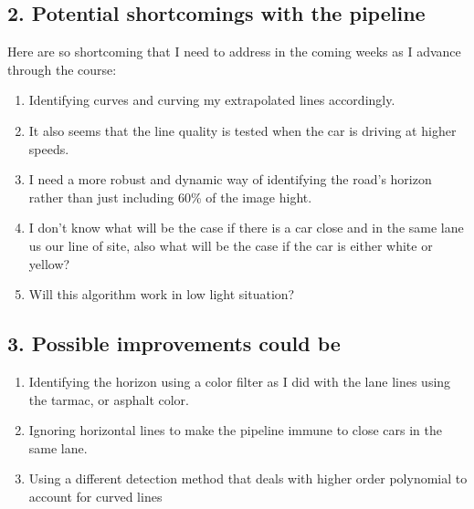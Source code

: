 \documentclass[11pt]{article}
\providecommand{\tightlist}{%
      \setlength{\itemsep}{0pt}\setlength{\parskip}{0pt}}
\begin{document}
    \hypertarget{potential-shortcomings-with-the-pipeline}{%
\subsection{2. Potential shortcomings with the
pipeline}\label{potential-shortcomings-with-the-pipeline}}

Here are so shortcoming that I need to address in the coming weeks as I
advance through the course:

\begin{enumerate}
\def\labelenumi{\arabic{enumi}.}
\tightlist
\item
  Identifying curves and curving my extrapolated lines accordingly.
\item
  It also seems that the line quality is tested when the car is driving
  at higher speeds.
\item
  I need a more robust and dynamic way of identifying the road's horizon
  rather than just including 60\% of the image hight.
\item
  I don't know what will be the case if there is a car close and in the
  same lane us our line of site, also what will be the case if the car
  is either white or yellow?
\item
  Will this algorithm work in low light situation?
\end{enumerate}

    \hypertarget{possible-improvements-could-be}{%
\subsection{3. Possible improvements could
be}\label{possible-improvements-could-be}}

\begin{enumerate}
\def\labelenumi{\arabic{enumi}.}
\tightlist
\item
  Identifying the horizon using a color filter as I did with the lane
  lines using the tarmac, or asphalt color.
\item
  Ignoring horizontal lines to make the pipeline immune to close cars in
  the same lane.
\item
  Using a different detection method that deals with higher order
  polynomial to account for curved lines
\end{enumerate}


    
    
    
    
\end{document}
